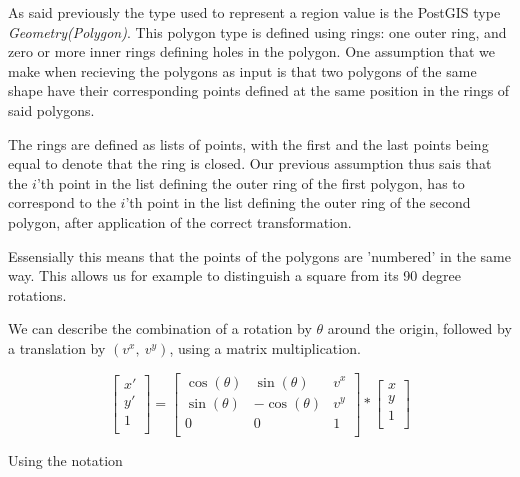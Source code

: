 
As said previously the type used to represent a region value is the PostGIS type \textit{Geometry(Polygon)}. This polygon type is defined using rings: one outer ring, and zero or more inner rings defining holes in the polygon. One assumption that we make when recieving the polygons as input is that two polygons of the same shape have their corresponding points defined at the same position in the rings of said polygons. 

The rings are defined as lists of points, with the first and the last points being equal to denote that the ring is closed. Our previous assumption thus sais that the $i$'th point in the list defining the outer ring of the first polygon, has to correspond to the $i$'th point in the list defining the outer ring of the second polygon, after application of the correct transformation.

Essensially this means that the points of the polygons are 'numbered' in the same way. This allows us for example to distinguish a square from its 90 degree rotations.


We can describe the combination of a rotation by $\theta$ around the origin, followed by a translation by $(v^x,\ v^y)$, using a matrix multiplication.

\[
    \begin{bmatrix}
    x' \\
    y' \\ 
    1  \\       
    \end{bmatrix}
    =
    \begin{bmatrix}
    \cos(\theta) & \sin(\theta)  & v^x \\
    \sin(\theta) & -\cos(\theta) & v^y \\ 
    0            & 0             & 1   \\       
    \end{bmatrix}
    *
    \begin{bmatrix}
    x \\
    y \\ 
    1 \\       
    \end{bmatrix}
\]

Using the notation

